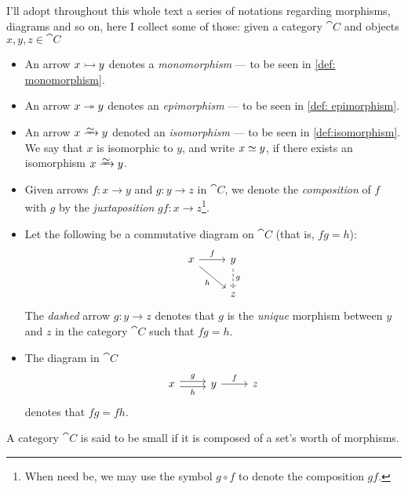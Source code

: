 \begin{notation}
    I'll adopt throughout this whole text a series of notations regarding morphisms,
    diagrams and so on, here I collect some of those: given a category \(\cat
    C\) and objects \(x, y, z \in \cat C\)
    \begin{itemize}\setlength\itemsep{0em}
        \item An arrow \(x \rightarrowtail y\) denotes a \emph{monomorphism} --- to be seen in
              \cref{def: monomorphism}.
        \item An arrow \(x \twoheadrightarrow y\) denotes an \emph{epimorphism} --- to be seen in
              \cref{def: epimorphism}.
        \item An arrow \(x \isoto y\) denoted an \emph{isomorphism} --- to be seen in
              \cref{def:isomorphism}. We say that \(x\) is isomorphic to \(y\), and write
              \(x \simeq y\), if there exists an isomorphism \(x \isoto y\).
        \item Given arrows \(f: x \to y\) and \(g: y \to z\) in \(\cat C\), we denote
              the \emph{composition} of \(f\) with \(g\) by the \emph{juxtaposition} \(gf: x
              \to z\)\footnote{When need be, we may use the symbol \(g \circ f\) to denote
                  the composition \(g f\).}.
        \item Let the following be a commutative diagram on \(\cat C\) (that is, \(fg =
              h\)):
              \[
                  \begin{tikzcd}
                      x \ar[r, "f"] \ar[rd, swap, "h"] &y \ar[d, dashed, "g"] \\ &z
                  \end{tikzcd}
              \]
              The \emph{dashed} arrow \(g: y \to z\) denotes that \(g\) is the \emph{unique}
              morphism between \(y\) and \(z\) in the category \(\cat C\) such that \(fg =
              h\).
        \item The diagram in \(\cat C\)
              \[
                  \begin{tikzcd}
                      x \ar[r, shift right, swap, "h"] \ar[r, shift left, "g"]
                      &y \ar[r, "f"]
                      &z
                  \end{tikzcd}
              \]
              denotes that \(f g = f h\).
    \end{itemize}
\end{notation}

\begin{definition}[Small]\label{def: small cat}
    A category \(\cat C\) is said to be small if it is composed of a set's worth of
    morphisms.
\end{definition}

